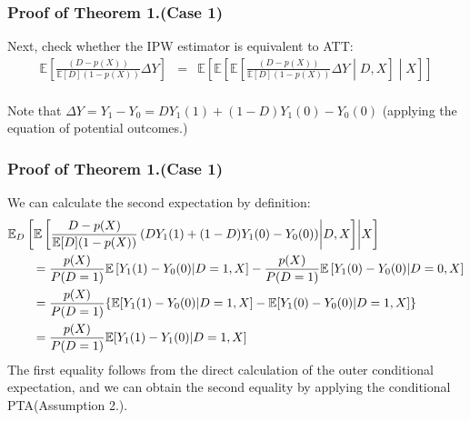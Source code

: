 \documentclass{beamer}
\begin{document}
\begin{frame}\frametitle{Proof of Theorem 1.(Case 1)}
    Next, check whether the IPW estimator is equivalent to ATT:
    \begin{eqnarray*}
        \mathbb{E}\left[\frac{(D-p(X))}{\mathbb{E}[D](1-p(X))}\Delta Y \right] &=&\mathbb{E}\left[\mathbb{E}\left[\mathbb{E}\left[\frac{(D-p(X))}{\mathbb{E}[D](1-p(X))}\Delta Y\middle|D,X\right]\middle|X\right]\right] \\
    \end{eqnarray*}

    Note that $\Delta Y = Y_{1} - Y_{0} = DY_{1}(1) + (1-D)Y_{1}(0) - Y_{0}(0)$ (applying the equation of potential outcomes.) \\
\end{frame}

\begin{frame}\frametitle{Proof of Theorem 1.(Case 1)}
    We can calculate the second expectation by definition:
    \footnotesize
    \begin{align*}
        \MoveEqLeft
        \mathbb{E}_{D}\left[\mathbb{E}\left[\frac{D-p(X)}{\mathbb{E}[D](1-p(X))}\left(DY_{1}(1) + (1-D)Y_{1}(0) - Y_{0}(0)\right)\middle|D,X\right]\middle|X \right]
        \\&= 
        \frac{p(X)}{P(D = 1)}\mathbb{E}\left[Y_{1}(1) - Y_{0}(0)\middle|D = 1, X\right] - \frac{p(X)}{P(D = 1)}\mathbb{E}\left[Y_{1}(0) - Y_{0}(0)\middle|D = 0, X \right]
        \\&= 
        \frac{p(X)}{P(D = 1)} \{ \mathbb{E}[Y_{1}(1) - Y_{0}(0)|D = 1, X] - \mathbb{E}[Y_{1}(0) - Y_{0}(0)|D = 1, X] \}
        \\&=
        \frac{p(X)}{P(D = 1)}\mathbb{E}[Y_{1}(1) - Y_{1}(0)|D = 1, X]
    \end{align*}
    \normalsize
    The first equality follows from the direct calculation of the outer conditional expectation, and we can obtain the second equality by applying the conditional PTA(Assumption 2.).
\end{frame}
\end{document}
